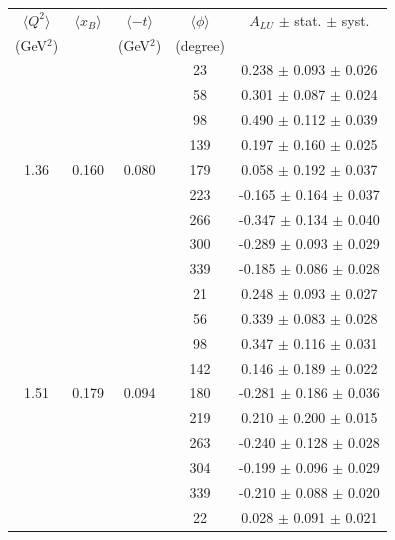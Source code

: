 \documentclass{article}
\begin{document}
\begin{table}[!h]
   \begin{center}
      \begin{tabular}{|c|c|c|c|c|}
         \hline
 $\langle Q^{2} \rangle$ & $\langle x_{B} \rangle$ & $\langle -t \rangle$ & $\langle \phi \rangle$ & $A_{LU}$ $\pm$ stat. $\pm$ syst.\\
 (GeV$^{2}$) &           & (GeV$^{2}$) & (degree) &  \\
  \hline
        &       &       &  23   &  0.238  $\pm$ 0.093  $\pm$ 0.026  \\
        &       &       &  58   &  0.301  $\pm$ 0.087  $\pm$ 0.024  \\
        &       &       &  98   &  0.490  $\pm$ 0.112  $\pm$ 0.039  \\
        &       &       & 139   &  0.197  $\pm$ 0.160  $\pm$ 0.025  \\
  1.36  & 0.160 & 0.080 & 179   &  0.058  $\pm$ 0.192  $\pm$ 0.037  \\
        &       &       & 223   & -0.165  $\pm$ 0.164  $\pm$ 0.037  \\
        &       &       & 266   & -0.347  $\pm$ 0.134  $\pm$ 0.040  \\
        &       &       & 300   & -0.289  $\pm$ 0.093  $\pm$ 0.029  \\
        &       &       & 339   & -0.185  $\pm$ 0.086  $\pm$ 0.028  \\
  \hline 
        &       &       &  21   &  0.248  $\pm$ 0.093  $\pm$ 0.027  \\ 
        &       &       &  56   &  0.339  $\pm$ 0.083  $\pm$ 0.028  \\ 
        &       &       &  98   &  0.347  $\pm$ 0.116  $\pm$ 0.031  \\ 
        &       &       & 142   &  0.146  $\pm$ 0.189  $\pm$ 0.022  \\ 
  1.51  & 0.179 & 0.094 & 180   & -0.281  $\pm$ 0.186  $\pm$ 0.036  \\ 
        &       &       & 219   &  0.210  $\pm$ 0.200  $\pm$ 0.015  \\ 
        &       &       & 263   & -0.240  $\pm$ 0.128  $\pm$ 0.028  \\ 
        &       &       & 304   & -0.199  $\pm$ 0.096  $\pm$ 0.029  \\ 
        &       &       & 339   & -0.210  $\pm$ 0.088  $\pm$ 0.020  \\ 
  \hline
        &       &       &  22   &  0.028  $\pm$ 0.091  $\pm$ 0.021  \\

\end{tabular}
\end{center}
\end{table}
\end{document}
